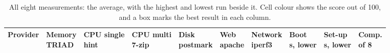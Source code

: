 \begin{table}[htbp]
  \centering
  \caption{All eight measurements: the average, with the highest and lowest run
           beside it. Cell colour shows the score out of 100, and a box marks the
           best result in each column.}
  \label{tab:bench-heatmap}
  \scriptsize
  \setlength{\tabcolsep}{1.2pt}
  \renewcommand{\arraystretch}{1.5}
  \begin{tabular}{@{}>{\raggedright\arraybackslash}m{1.25cm} *{8}{>{\centering\arraybackslash}m{1.55cm}} >{\centering\arraybackslash}m{0.8cm}@{}}
    \toprule
    Provider & \shortstack{\textbf{Memory}\\[-1pt]{\tiny TRIAD}} & \shortstack{\textbf{CPU single}\\[-1pt]{\tiny hint}} & \shortstack{\textbf{CPU multi}\\[-1pt]{\tiny 7-zip}} & \shortstack{\textbf{Disk}\\[-1pt]{\tiny postmark}} & \shortstack{\textbf{Web}\\[-1pt]{\tiny apache}} & \shortstack{\textbf{Network}\\[-1pt]{\tiny iperf3}} & \shortstack{\textbf{Boot}\\[-1pt]{\tiny s, lower}} & \shortstack{\textbf{Set-up}\\[-1pt]{\tiny s, lower}} & \shortstack{\textbf{Comp.}\\[-1pt]{\tiny of 8}} \\
    \midrule

\end{tabular}
\end{table}
